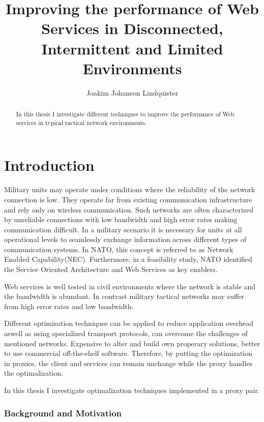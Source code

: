 \documentclass[USenglish]{article}
\title{Improving the performance of Web Services in Disconnected, Intermittent and Limited Environments}
\author{Joakim Johanson Lindquister}
\begin{document}
\ififorside{}

\begin{abstract}
In this thesis I investigate different techniques to improve the performance of Web services in typical tactical network environments.
\end{abstract}
\pagebreak

\tableofcontents
\listoftables
\listoffigures

\pagebreak


\part{Introduction}
Military units may operate under conditions where the reliability of the network connection is low. They operate far from existing communication infrastructure and rely only on wireless communication. Such networks are often characterized by unreliable connections with low bandwidth and high error rates making communication difficult. In a military scenario it is necessary for units at all operational levels to seamlessly exchange information across different types of communication systems. In NATO, this concept is referred to as Network Enabled Capability(NEC). Furthermore, in a feasibility study, NATO identified the Service Oriented Architecture and Web Services as key enablers\cite{nnec-study}.

Web services is well tested in civil environments where the network is stable and the bandwidth is abundant. In contrast military tactical networks may suffer from high error rates and low bandwidth.

Different optimization techniques can be applied to reduce application overhead aswell as using specialized transport protocols, can overcome the challenges of mentioned networks.
Expensive to alter and build own properary solutions, better to use commercial off-the-shelf software. Therefore, by putting the optimization in proxies, the client and services can remain unchange while the proxy handles the optimalization.

In this thesis I investigate optimalization techniques implemented in a proxy pair.

\section{Background and Motivation}
\end{document}
